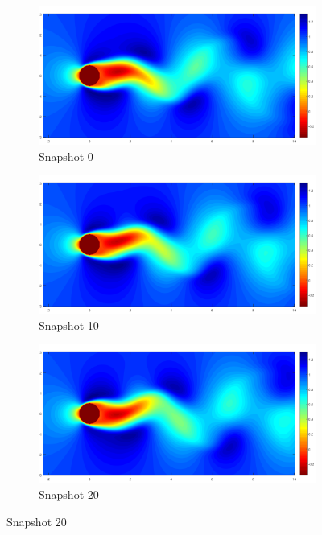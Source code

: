 \documentclass[letterpaper,12pt,peerreviewca,draftcls]{IEEEtran}
\begin{document}
\begin{figure}[h] %
	\centering
	\begin{subfigure}[t]{0.23\textwidth}
		\includegraphics[width=\linewidth]{"Figure S6a"}
		\caption{Snapshot 0}
	\end{subfigure}
	\begin{subfigure}[t]{0.23\textwidth}
		\includegraphics[width=\linewidth]{"Figure S6b"}
		\caption{Snapshot 10}
	\end{subfigure}
	\begin{subfigure}[t]{0.23\textwidth}
		\includegraphics[width=\linewidth]{"Figure S6c"}
		\caption{Snapshot 20}

\end{subfigure}
\end{figure}
\end{document}
